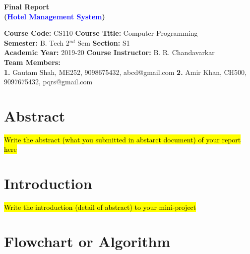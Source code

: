 \documentclass[12pt]{article}
\begin{document}




\begin{center}
    \textbf{\Large{Final Report \\
    (\textcolor{blue}{Hotel Management System})}}
\end{center}

\noindent 
\textbf{Course Code:} CS110 
\hspace{2in} 
\textbf{Course Title:} Computer Programming \\
\textbf{Semester:} B. Tech 2$^{nd}$ Sem 
\hspace{1.6in} 
\textbf{Section:} S1 \\
\textbf{Academic Year:} 2019-20 
\hspace{1.8in} 
\textbf{Course Instructor:} B. R. Chandavarkar \\
\textbf{Team Members:} \\
\textbf{1.} Gautam Shah, ME252, 9098675432, abcd@gmail.com 
\newline
\textbf{2.} Amir Khan, CH500, 9097675432, pqrs@gmail.com

\vspace{0.25in}

\section{Abstract}

\hl{Write the abstract (what you submitted in abstarct document) of your report here}

\newpage                %
\section{Introduction}  %

\hl{Write the introduction (detail of abstract) to your mini-project}

\newpage                            %
\section{Flowchart or Algorithm}    %
\end{document}
